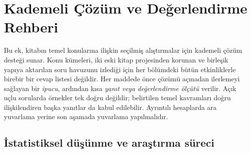 \chapter{Kademeli Çözüm ve Değerlendirme Rehberi}
\label{app:answer-key}

Bu ek, kitabın temel konularına ilişkin seçilmiş alıştırmalar için kademeli
çözüm desteği sunar. Konu kümeleri, iki eski kitap projesinden korunan ve
birleşik yapıya aktarılan soru havuzunu izlediği için her bölümdeki bütün
etkinliklerle birebir bir cevap listesi değildir. Her maddede önce çözümü
açmadan ilerlemeyi sağlayan bir \emph{ipucu}, ardından kısa \emph{yanıt veya
değerlendirme ölçütü} verilir. Açık uçlu sorularda örnekler tek doğru
değildir; belirtilen temel kavramları doğru ilişkilendiren başka yanıtlar da
kabul edilebilir. Ayrıntılı hesaplarda ara yuvarlama yerine son aşamada
yuvarlama yapılmalıdır.

\section{İstatistiksel düşünme ve araştırma süreci}

